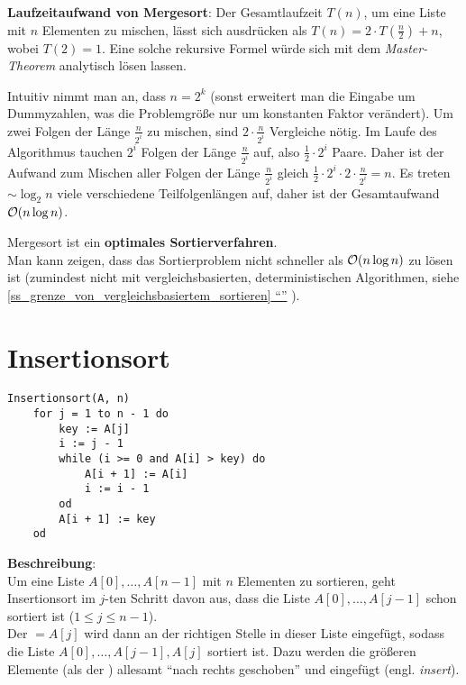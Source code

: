 \linie

\textbf{Laufzeitaufwand von Mergesort}: Der Gesamtlaufzeit $T(n)$, um
eine Liste mit $n$ Elementen zu mischen, lässt sich ausdrücken als
$T(n) = 2 \cdot T(\frac{n}{2}) + n$, wobei $T(2) = 1$.
Eine solche rekursive Formel würde sich mit dem \emph{Master-Theorem}
analytisch lösen lassen.

Intuitiv nimmt man an, dass $n = 2^k$ (sonst erweitert man die Eingabe um
Dummyzahlen, was die Problemgröße nur um konstanten Faktor verändert).
Um zwei Folgen der Länge $\frac{n}{2^i}$ zu mischen, sind
$2 \cdot \frac{n}{2^i}$ Vergleiche nötig.
Im Laufe des Algorithmus tauchen $2^i$ Folgen der Länge $\frac{n}{2^i}$ auf,
also $\frac{1}{2} \cdot 2^i$ Paare.
Daher ist der Aufwand zum Mischen aller Folgen der Länge $\frac{n}{2^i}$
gleich $\frac{1}{2} \cdot 2^i \cdot 2 \cdot \frac{n}{2^i} = n$.
Es treten $\sim \log_2 n$ viele verschiedene Teilfolgenlängen auf,
daher ist der Gesamtaufwand $\mathcal{O}(n \log n)$.

Mergesort ist ein \textbf{optimales Sortierverfahren}. \\
Man kann zeigen, dass das Sortierproblem nicht schneller als
$\mathcal{O}(n \log n)$ zu lösen ist
(zumindest nicht mit vergleichsbasierten, deterministischen Algorithmen,
siehe
\hyperref[ss_grenze_von_vergleichsbasiertem_sortieren]{%
    \autoref{ss_grenze_von_vergleichsbasiertem_sortieren}
    "`"'}%
).

\pagebreak

\section{%
    Insertionsort%
}

\begin{lstlisting}
Insertionsort(A, n)
    for j = 1 to n - 1 do
        key := A[j]
        i := j - 1
        while (i >= 0 and A[i] > key) do
            A[i + 1] := A[i]
            i := i - 1
        od
        A[i + 1] := key
    od
\end{lstlisting}

\textbf{Beschreibung}: \\
Um eine Liste $A[0], \ldots, A[n - 1]$ mit $n$ Elementen zu sortieren, geht
Insertionsort im $j$-ten Schritt davon aus, dass die
Liste $A[0], \ldots, A[j - 1]$
schon sortiert ist ($1 \le j \le n - 1$). \\
Der  $= A[j]$ wird dann an der richtigen Stelle in dieser Liste
eingefügt, sodass die Liste
$A[0], \ldots, A[j - 1], A[j]$ sortiert ist.
Dazu werden die größeren Elemente (als der ) allesamt
"`nach rechts geschoben"' und  eingefügt (engl. \emph{insert}).

